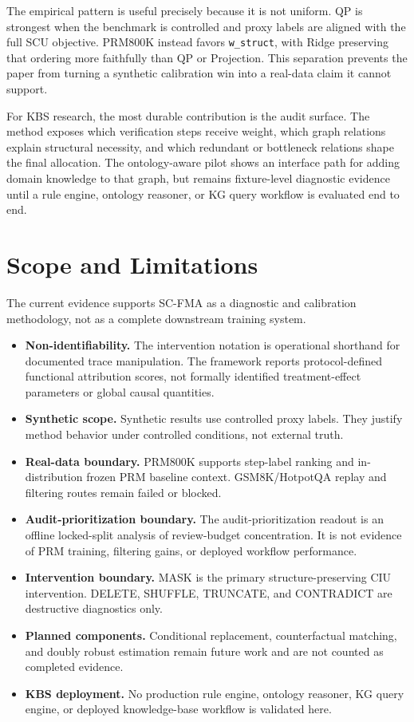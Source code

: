 \documentclass[a4paper,fleqn]{cas-sc}
\begin{document}
The empirical pattern is useful precisely because it is not uniform. QP is strongest when the benchmark is controlled and proxy labels are aligned with the full SCU objective. PRM800K instead favors \texttt{w\_struct}, with Ridge preserving that ordering more faithfully than QP or Projection. This separation prevents the paper from turning a synthetic calibration win into a real-data claim it cannot support.

For KBS research, the most durable contribution is the audit surface. The method exposes which verification steps receive weight, which graph relations explain structural necessity, and which redundant or bottleneck relations shape the final allocation. The ontology-aware pilot shows an interface path for adding domain knowledge to that graph, but remains fixture-level diagnostic evidence until a rule engine, ontology reasoner, or KG query workflow is evaluated end to end.

\section{Scope and Limitations}
\label{sec:limitations}

The current evidence supports SC-FMA as a diagnostic and calibration methodology, not as a complete downstream training system.
\begin{itemize}
\item \textbf{Non-identifiability.} The intervention notation is operational shorthand for documented trace manipulation. The framework reports protocol-defined functional attribution scores, not formally identified treatment-effect parameters or global causal quantities.
\item \textbf{Synthetic scope.} Synthetic results use controlled proxy labels. They justify method behavior under controlled conditions, not external truth.
\item \textbf{Real-data boundary.} PRM800K supports step-label ranking and in-distribution frozen PRM baseline context. GSM8K/HotpotQA replay and filtering routes remain failed or blocked.
\item \textbf{Audit-prioritization boundary.} The audit-prioritization readout is an offline locked-split analysis of review-budget concentration. It is not evidence of PRM training, filtering gains, or deployed workflow performance.
\item \textbf{Intervention boundary.} MASK is the primary structure-preserving CIU intervention. DELETE, SHUFFLE, TRUNCATE, and CONTRADICT are destructive diagnostics only.
\item \textbf{Planned components.} Conditional replacement, counterfactual matching, and doubly robust estimation remain future work and are not counted as completed evidence.
\item \textbf{KBS deployment.} No production rule engine, ontology reasoner, KG query engine, or deployed knowledge-base workflow is validated here.
\end{itemize}
\end{document}

